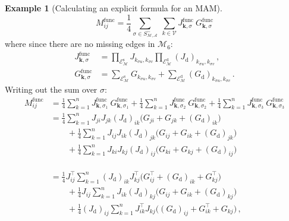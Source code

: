\documentclass[12pt,draft]{ociamthesis}
\theoremstyle{plain}
\theoremstyle{definition}
\newtheorem{example}{Example}[chapter]
\theoremstyle{remark}
\newcommand\ca[1]{\mathcal{#1}}
\begin{document}
\begin{example}[Calculating an explicit formula for an MAM]
  $$
  M^\mathrm{func}_{i j} = \frac{1}{4} \sum_{\sigma \in S_\ca{M,A}^\sim} \
  \sum_{k \in \ca{V}} J^\mathrm{func}_{\mathbf{k},\sigma} \
  G^\mathrm{func}_{\mathbf{k},\sigma}
  $$
  where since there are no missing edges in $\ca{M}_6$:
  \begin{align*}
    J^\mathrm{func}_{\mathbf{k},\sigma}
    &= \prod_{\ca{E}_\ca{M}^\mathrm{s}} J_{k_{\sigma u},k_{\sigma v}}
    \prod_{\ca{E}_\ca{M}^\mathrm{d}} (J_\mathrm{d})_{k_{\sigma u},k_{\sigma
    v}}\,, \\
    G^\mathrm{func}_{\mathbf{k},\sigma}
    &= \sum_{\ca{E}_\ca{M}^\mathrm{s}} G_{k_{\sigma u},k_{\sigma v}}
    + \sum_{\ca{E}_\ca{M}^\mathrm{d}} (G_\mathrm{d})_{k_{\sigma u},k_{\sigma
    v}}\,.
  \end{align*}
  Writing out the sum over $\sigma$:
  \begingroup
  \allowdisplaybreaks
  \begin{align*}
    M^\mathrm{func}_{i j}
    &= \frac{1}{4} \sum_{k=1}^n J^\mathrm{func}_{\mathbf{k},\sigma_1} \
    G^\mathrm{func}_{\mathbf{k},\sigma_1} + \frac{1}{4} \sum_{k=1}^n
    J^\mathrm{func}_{\mathbf{k},\sigma_2} \
    G^\mathrm{func}_{\mathbf{k},\sigma_2} + \frac{1}{4} \sum_{k=1}^n
    J^\mathrm{func}_{\mathbf{k},\sigma_3} \
    G^\mathrm{func}_{\mathbf{k},\sigma_3} \\
    &=         \frac{1}{4} \sum_{k=1}^n J_{j i} J_{j k} (J_\mathrm{d})_{i k}
    \big(G_{j i} + G_{j k} + (G_\mathrm{d})_{i k}\big) \\
    & \qquad + \frac{1}{4} \sum_{k=1}^n J_{i j} J_{i k} (J_\mathrm{d})_{j k}
    \big(G_{i j} + G_{i k} + (G_\mathrm{d})_{j k}\big) \\
    & \qquad + \frac{1}{4} \sum_{k=1}^n J_{k i} J_{k j} (J_\mathrm{d})_{i j}
    \big(G_{k i} + G_{k j} + (G_\mathrm{d})_{i j}\big) \\
    & \\
    & \\
    & \\
    &=         \frac{1}{4} J^\top_{i j} \sum_{k=1}^n (J_\mathrm{d})_{i k}
    J^\top_{k j} \big(G^\top_{i j} + (G_\mathrm{d})_{i k} + G^\top_{k j}\big) \\
    & \qquad + \frac{1}{4} J_{i j} \sum_{k=1}^n J_{i k}
    (J_\mathrm{d})_{k j} \big(G_{i j} + G_{i k} + (G_\mathrm{d})_{k j}\big) \\
    & \qquad + \frac{1}{4} (J_\mathrm{d})_{i j}
    \sum_{k=1}^n J^\top_{i k} J_{k j}
    \big((G_\mathrm{d})_{i j} + G^\top_{i k} + G_{k j}\big) \,,
  \end{align*}

\end{example}
\end{document}
